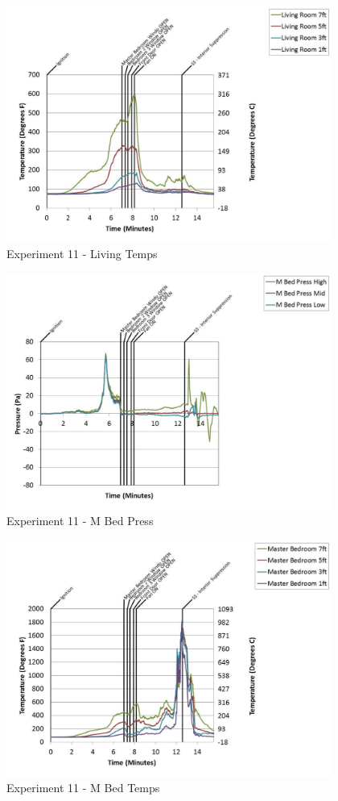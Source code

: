 \documentclass{article}
\begin{document}
\begin{appendices}
	\begin{figure}[h!]
		\centering
		\includegraphics[height=3.05in]{0_Images/Results_Charts/Exp_11_Charts/LivingTemps.pdf}
		\caption{Experiment 11 - Living Temps}
	\end{figure}
 
	\clearpage

	\begin{figure}[h!]
		\centering
		\includegraphics[height=3.05in]{0_Images/Results_Charts/Exp_11_Charts/MBedPress.pdf}
		\caption{Experiment 11 - M Bed Press}
	\end{figure}
 

	\begin{figure}[h!]
		\centering
		\includegraphics[height=3.05in]{0_Images/Results_Charts/Exp_11_Charts/MBedTemps.pdf}
		\caption{Experiment 11 - M Bed Temps}
	\end{figure}
 

\end{appendices}
\end{document}
